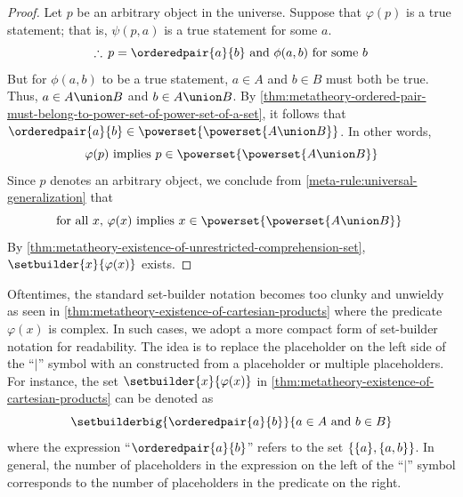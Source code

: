 \begin{proof}
    Let \( p \) be an arbitrary object in the universe.
    Suppose that \( \varphi(p) \) is a true statement;
    that is, \( \psi(p, a) \) is a true statement for some \( a \).
    \begin{equation*}
        \therefore \, p = \orderedpair{a}{b} \ \text{and} \ \phi(a, b) \ \text{for some \( b \)}
    \end{equation*}
    But for \( \phi(a, b) \) to be a true statement, \( a \in A \) and \( b \in B \) must both be true.
    Thus, \( a \in A \union B \) and \( b \in A \union B \).
    By \cref{thm:metatheory-ordered-pair-must-belong-to-power-set-of-power-set-of-a-set}, it follows that
    \( \orderedpair{a}{b} \in \powerset{\powerset{A \union B}} \).
    In other words,
    \begin{equation*}
        \varphi(p) \ \text{implies} \ p \in \powerset{\powerset{A \union B}}
    \end{equation*}
    Since \( p \) denotes an arbitrary object, we conclude from \cref{meta-rule:universal-generalization} that
    \begin{equation*}
        \text{for all \( x \), \( \varphi(x) \) implies \( x \in \powerset{\powerset{A \union B}} \) }
    \end{equation*}
    By \cref{thm:metatheory-existence-of-unrestricted-comprehension-set},
    \( \setbuilder{x}{\varphi(x)} \) exists.
\end{proof}

\begin{notation}
    Oftentimes, the standard set-builder notation becomes too clunky and unwieldy
    as seen in \cref{thm:metatheory-existence-of-cartesian-products} where the predicate \( \varphi(x) \)
    is complex.
    In such cases, we adopt a more compact form of set-builder notation for readability.
    The idea is to replace the placeholder on the left side of the ``\( \vert \)'' symbol with an 
    constructed from a placeholder or multiple placeholders.
    For instance, the set \( \setbuilder{x}{\varphi(x)} \) in \cref{thm:metatheory-existence-of-cartesian-products} can be denoted as
    \begin{equation*}
        \setbuilderbig{\orderedpair{a}{b}}{a \in A \ \text{and} \ b \in B}
    \end{equation*}
    where the expression ``\( \orderedpair{a}{b} \)'' refers to the set \( \mleft\{ \mleft\{ a \mright\}, \mleft\{ a, b \mright\} \mright\} \).
    In general, the number of placeholders in the expression on the left of the ``\( \vert \)'' symbol corresponds to the number of placeholders
    in the predicate on the right.
\end{notation}

